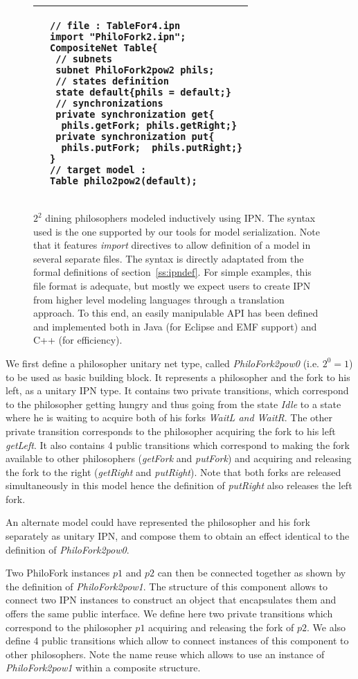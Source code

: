 \begin{figure}
\begin{tabular}{l|l}
&
\begin{lstlisting}
// file : TableFor4.ipn
import "PhiloFork2.ipn";
CompositeNet Table{
 // subnets
 subnet PhiloFork2pow2 phils;
 // states definition
 state default{phils = default;}
 // synchronizations
 private synchronization get{
  phils.getFork; phils.getRight;}
 private synchronization put{
  phils.putFork;  phils.putRight;}
}
// target model :
Table philo2pow2(default);
\end{lstlisting}
\\
\hline
\end{tabular}
\caption{$2^2$ dining philosophers modeled inductively using IPN. The syntax used is the one supported by our tools for model serialization. Note that it features \emph{import} directives to allow definition of a model in several separate files. The syntax is directly adaptated from the formal definitions of section~\ref{ss:ipndef}.\label{fig:philo}
For simple examples, this file format is adequate, but mostly we expect users to
create IPN from higher level modeling languages through a translation
approach. To this end, an easily manipulable API has been defined and
implemented both in Java (for Eclipse and EMF support) and C++ (for efficiency). }
\end{figure}

We first define a philosopher unitary net type, called
\emph{PhiloFork2pow0} (i.e. $2^0 =1$) to be used as basic building
block. It represents a philosopher and the fork to his left, as a
unitary IPN type.  It contains two private transitions, which
correspond to the philosopher getting hungry and thus going from the
state \emph{Idle} to a state where he is waiting to acquire both of
his forks \emph{WaitL and WaitR}.  The other private transition
corresponds to the philosopher acquiring the fork to his left
\emph{getLeft}.  It also contains 4 public transitions which
correspond to making the fork available to other philosophers
(\emph{getFork} and \emph{putFork}) and acquiring and releasing the
fork to the right (\emph{getRight} and \emph{putRight}). Note that
both forks are released simultaneously in
 this model hence the definition of \emph{putRight} also releases the
 left fork.

An alternate model could have represented the philosopher and his fork
separately as unitary IPN, and compose them to obtain an effect identical to the
definition of \emph{PhiloFork2pow0}.

Two PhiloFork instances $p1$ and $p2$ can then be connected together
as shown by the definition of \emph{PhiloFork2pow1}. The structure
of this component allows to connect two IPN instances to construct
an object that encapsulates them and offers the same public
interface. We define here two private transitions which correspond
to the philosopher $p1$ acquiring and releasing the fork of $p2$. We
also define 4 public transitions which allow to connect instances of
this component to other philosophers.  Note the name reuse which
allows to use an instance of \emph{PhiloFork2pow1} within a
composite structure.

